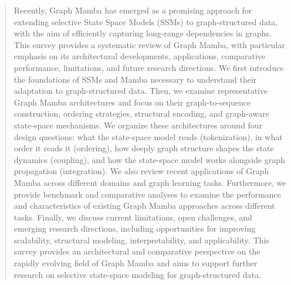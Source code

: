 \documentclass[acmsmall]{acmart}
\begin{document}
\begin{abstract}
Recently, Graph Mamba has emerged as a promising approach for extending selective State Space Models (SSMs) to graph-structured data, with the aim of efficiently capturing long-range dependencies in graphs. This survey provides a systematic review of Graph Mamba, with particular emphasis on its architectural developments, applications, comparative performance, limitations, and future research directions. We first introduce the foundations of SSMs and Mamba necessary to understand their adaptation to graph-structured data. Then, we examine representative Graph Mamba architectures and focus on their graph-to-sequence construction, ordering strategies, structural encoding, and graph-aware state-space mechanisms. {We organize these architectures around four design questions: what the state-space model reads (tokenization), in what order it reads it (ordering), how deeply graph structure shapes the state dynamics (coupling), and how the state-space model works alongside graph propagation (integration).} We also review recent applications of Graph Mamba across different domains and graph learning tasks. Furthermore, we provide benchmark and comparative analyses to examine the performance and characteristics of existing Graph Mamba approaches across different tasks. Finally, we discuss current limitations, open challenges, and emerging research directions, including opportunities for improving scalability, structural modeling, interpretability, and applicability. This survey provides an architectural and comparative perspective on the rapidly evolving field of Graph Mamba and aims to support further research on selective state-space modeling for graph-structured data.
\end{abstract}
 


\maketitle
\end{document}
